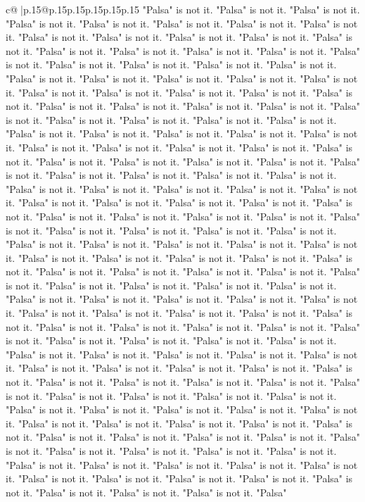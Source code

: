 \documentclass{article}
\begin{document}
{\begin{supertabular}{c@{$\;$}|p{.15\linewidth}@{}p{.15\linewidth}p{.15\linewidth}p{.15\linewidth}p{.15\linewidth}p{.15\linewidth}}
{{{"Palsa" is not it. "Palsa" is not it. "Palsa" is not it. "Palsa" is not it. "Palsa" is not it. "Palsa" is not it. "Palsa" is not it. "Palsa" is not it. "Palsa" is not it. "Palsa" is not it. "Palsa" is not it. "Palsa" is not it. "Palsa" is not it. "Palsa" is not it. "Palsa" is not it. "Palsa" is not it. "Palsa" is not it. "Palsa" is not it. "Palsa" is not it. "Palsa" is not it. "Palsa" is not it. "Palsa" is not it. "Palsa" is not it. "Palsa" is not it. "Palsa" is not it. "Palsa" is not it. "Palsa" is not it. "Palsa" is not it. "Palsa" is not it. "Palsa" is not it. "Palsa" is not it. "Palsa" is not it. "Palsa" is not it. "Palsa" is not it. "Palsa" is not it. "Palsa" is not it. "Palsa" is not it. "Palsa" is not it. "Palsa" is not it. "Palsa" is not it. "Palsa" is not it. "Palsa" is not it. "Palsa" is not it. "Palsa" is not it. "Palsa" is not it. "Palsa" is not it. "Palsa" is not it. "Palsa" is not it. "Palsa" is not it. "Palsa" is not it. "Palsa" is not it. "Palsa" is not it. "Palsa" is not it. "Palsa" is not it. "Palsa" is not it. "Palsa" is not it. "Palsa" is not it. "Palsa" is not it. "Palsa" is not it. "Palsa" is not it. "Palsa" is not it. "Palsa" is not it. "Palsa" is not it. "Palsa" is not it. "Palsa" is not it. "Palsa" is not it. "Palsa" is not it. "Palsa" is not it. "Palsa" is not it. "Palsa" is not it. "Palsa" is not it. "Palsa" is not it. "Palsa" is not it. "Palsa" is not it. "Palsa" is not it. "Palsa" is not it. "Palsa" is not it. "Palsa" is not it. "Palsa" is not it. "Palsa" is not it. "Palsa" is not it. "Palsa" is not it. "Palsa" is not it. "Palsa" is not it. "Palsa" is not it. "Palsa" is not it. "Palsa" is not it. "Palsa" is not it. "Palsa" is not it. "Palsa" is not it. "Palsa" is not it. "Palsa" is not it. "Palsa" is not it. "Palsa" is not it. "Palsa" is not it. "Palsa" is not it. "Palsa" is not it. "Palsa" is not it. "Palsa" is not it. "Palsa" is not it. "Palsa" is not it. "Palsa" is not it. "Palsa" is not it. "Palsa" is not it. "Palsa" is not it. "Palsa" is not it. "Palsa" is not it. "Palsa" is not it. "Palsa" is not it. "Palsa" is not it. "Palsa" is not it. "Palsa" is not it. "Palsa" is not it. "Palsa" is not it. "Palsa" is not it. "Palsa" is not it. "Palsa" is not it. "Palsa" is not it. "Palsa" is not it. "Palsa" is not it. "Palsa" is not it. "Palsa" is not it. "Palsa" is not it. "Palsa" is not it. "Palsa" is not it. "Palsa" is not it. "Palsa" is not it. "Palsa" is not it. "Palsa" is not it. "Palsa" is not it. "Palsa" is not it. "Palsa" is not it. "Palsa" is not it. "Palsa" is not it. "Palsa" is not it. "Palsa" is not it. "Palsa" is not it. "Palsa" is not it. "Palsa" is not it. "Palsa" is not it. "Palsa" is not it. "Palsa" is not it. "Palsa" is not it. "Palsa" is not it. "Palsa" is not it. "Palsa" is not it. "Palsa" is not it. "Palsa" is not it. "Palsa" is not it. "Palsa" is not it. "Palsa" is not it. "Palsa" is not it. "Palsa" is not it. "Palsa" is not it. "Palsa" is not it. "Palsa" is not it. "Palsa" is not it. "Palsa" is not it. "Palsa" is not it. "Palsa" is not it. "Palsa" is not it. "Palsa" is not it. "Palsa" is not it. "Palsa" is not it. "Palsa" is not it. "Palsa" is not it. "Palsa" is not it. "Palsa" is not it. "Palsa" }}}
\end{supertabular}}
\end{document}

